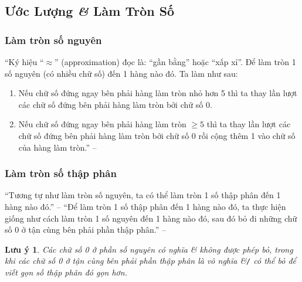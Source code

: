 \documentclass{article}
\numberwithin{equation}{section}
\newtheorem{luuy}{Lưu ý}[section]
\begin{document}

\subsection{Ước Lượng \textit{\&} Làm Tròn Số}

\subsubsection{Làm tròn số nguyên}
``Ký hiệu ``$\approx$'' (approximation) đọc là: ``gần bằng'' hoặc ``xấp xỉ''. Để làm tròn 1 số nguyên (có nhiều chữ số) đến 1 hàng nào đó. Ta làm như sau:
\begin{enumerate}
	\item Nếu chữ số đứng ngay bên phải hàng làm tròn nhỏ hơn 5 thì ta thay lần lượt các chữ số đứng bên phải hàng làm tròn bởi chữ số 0.
	\item Nếu chữ số đứng ngay bên phải hàng làm tròn $\ge 5$ thì ta thay lần lượt các chữ số đứng bên phải hàng làm tròn bởi chữ số 0 rồi cộng thêm 1 vào chữ số của hàng làm tròn.'' -- \cite[p. 58]{SGK_Toan_6_Canh_Dieu_tap_2}
\end{enumerate}

\subsubsection{Làm tròn số thập phân}
``Tương tự như làm tròn số nguyên, ta có thể làm tròn 1 số thập phân đến 1 hàng nào đó.'' -- \cite[p. 58]{SGK_Toan_6_Canh_Dieu_tap_2} ``Để làm tròn 1 số thập phân đến 1 hàng nào đó, ta thực hiện giống như cách làm tròn 1 số nguyên đến 1 hàng nào đó, sau đó bỏ đi những chữ số 0 ở tận cùng bên phải phần thập phân.'' -- \cite[p. 59]{SGK_Toan_6_Canh_Dieu_tap_2}

\begin{luuy}
	Các chữ số 0 ở phần số nguyên có nghĩa \textit{\&} không được phép bỏ, trong khi các chữ số 0 ở tận cùng bên phải phần thập phân là vô nghĩa \&\emph{\texttt{/}} có thể bỏ để viết gọn số thập phân đó gọn hơn.
\end{luuy}
\end{document}
